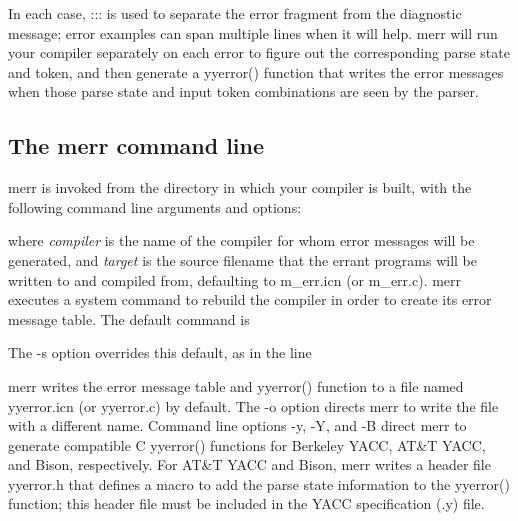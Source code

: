 
In each case, \textsf{:::} is used to separate the error fragment from
the diagnostic message; error examples can span multiple lines when it
will help. \textsf{merr} will run your compiler separately on each error to
figure out the corresponding parse state and token, and then generate a
yyerror() function that writes the error messages when those parse
state and input token combinations are seen by the parser.

\subsection{The \textsf{merr} command line}

\textsf{merr} is invoked from the directory in which your compiler is built, with
the following command line arguments and options:


\noindent
where \textit{compiler} is the name of the compiler for whom error
messages will be generated, and \textit{target} is the source filename
that the errant programs will be written to and compiled from,
defaulting to \textsf{m\_err.icn} (or \textsf{m\_err.c}). \textsf{merr} executes
a system command to rebuild the compiler in order to create its error
message table. The default command is


The \textsf{{}-s} option overrides this default, as in the line


\textsf{merr} writes the error message table and \textsf{yyerror()} function to a
file named \textsf{yyerror.icn} (or \textsf{yyerror.c}) by default. The
\textsf{{}-o} option directs \textsf{merr} to write the file with a different
name. Command line options \textsf{{}-y}, \textsf{{}-Y}, and
\textsf{{}-B} direct \textsf{merr} to generate compatible C \textsf{yyerror()}
functions for Berkeley YACC, AT\&T YACC, and Bison, respectively. For
AT\&T YACC and Bison, \textsf{merr} writes a header file \textsf{yyerror.h} that
defines a macro to add the parse state information to the yyerror()
function; this header file must be included in the YACC specification
(.y) file.


